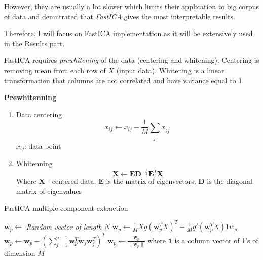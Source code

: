 \documentclass[12pt,]{book}
\providecommand{\tightlist}{%
  \setlength{\itemsep}{0pt}\setlength{\parskip}{0pt}}
\theoremstyle{definition}
\theoremstyle{definition}
\theoremstyle{definition}
\theoremstyle{remark}
\begin{document}
However, they are usually a lot slower which limits their application to
big corpus of data and \citet{Teschendorff2007} demntrated that
\emph{FastICA} gives the most interpretable results.

Therefore, I will focus on FastICA implementation as it will be
extensively used in the \protect\hyperlink{results}{Results} part.

FastICA requires \emph{prewhitening} of the data (centering and
whitening). Centering is removing mean from each row of \(X\) (input
data). Whitening is a linear transformation that columns are not
correlated and have variance equal to 1.

\textbf{Prewhitenning }

\begin{enumerate}
\def\labelenumi{\arabic{enumi}.}
\tightlist
\item
  Data centering \begin{equation}
    x_{ij} \leftarrow x_{ij} - {\frac {1}{M}}\sum_{j^{\prime }}x_{ij^{\prime }}  \label{eq:cent}
    \end{equation} \(x_{ij}\): data point
\item
  Whitenning \begin{equation}
   \mathbf {X} \leftarrow \mathbf {E}\mathbf {D} ^{-\frac{1}{2}}\mathbf {E} ^{T}\mathbf {X} \label{eq:whit}
   \end{equation} Where \(\mathbf {X}\) - centered data, \(\mathbf {E}\)
  is the matrix of eigenvectors, \(\mathbf{D}\) is the diagonal matrix
  of eigenvalues
\end{enumerate}

\begin{algorithm}
  \caption{ FastICA multiple component extraction}
  \begin{algorithmic}[1]
  \begin{equation}\label{eq:fasticaMul}\end{equation}
        \State $\mathbf{w}_{p} \gets$ \emph{Random vector of length} $N$
            \State $\mathbf{w}_p \gets \frac{1}{M}Xg(\mathbf{w}_p^TX)^T - \frac{1}{M}g'(\mathbf{w}_p^TX)1w_p$ 
            \State $\mathbf{w}_p \gets \mathbf{w}_p - (\sum_{j=1}^{p-1}\mathbf{w}_p^T\mathbf{w}_j\mathbf{w}_j^T)^T$
            \State $\mathbf{w}_p \gets \frac{\mathbf{w}_p}{\lVert \mathbf{w}_p \rVert}$
        \EndWhile
    \EndFor 
    \State where $\mathbf {1}$  is a column vector of 1's of dimension $M$ 

  \end{algorithmic}

\end{algorithm}
\end{document}
